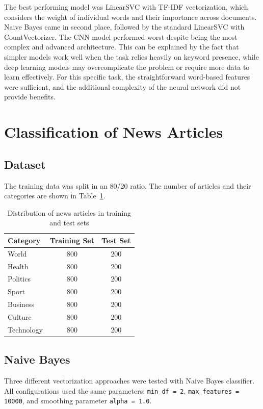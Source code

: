 \documentclass[12pt,a4paper]{article}
\begin{document}
The best performing model was LinearSVC with TF-IDF vectorization, which considers the weight of individual words and their importance across documents. Naive Bayes came in second place, followed by the standard LinearSVC with CountVectorizer. The CNN model performed worst despite being the most complex and advanced architecture. This can be explained by the fact that simpler models work well when the task relies heavily on keyword presence, while deep learning models may overcomplicate the problem or require more data to learn effectively. For this specific task, the straightforward word-based features were sufficient, and the additional complexity of the neural network did not provide benefits.
\newpage
\section{Classification of News Articles}

\subsection{Dataset}

The training data was split in an 80/20 ratio. The number of articles and their categories are shown in Table~\ref{tab:news_dataset}.

\begin{table}[h]
\centering
\begin{tabular}{lcc}
\toprule
Category & Training Set & Test Set \\
\midrule
World & 800 & 200 \\
Health & 800 & 200 \\
Politics & 800 & 200 \\
Sport & 800 & 200 \\
Business & 800 & 200 \\
Culture & 800 & 200 \\
Technology & 800 & 200 \\
\bottomrule
\end{tabular}
\caption{Distribution of news articles in training and test sets}
\label{tab:news_dataset}
\end{table}

\subsection{Naive Bayes}

Three different vectorization approaches were tested with Naive Bayes classifier. All configurations used the same parameters: \texttt{min\_df = 2}, \texttt{max\_features = 10000}, and smoothing parameter \texttt{alpha = 1.0}.
\end{document}
